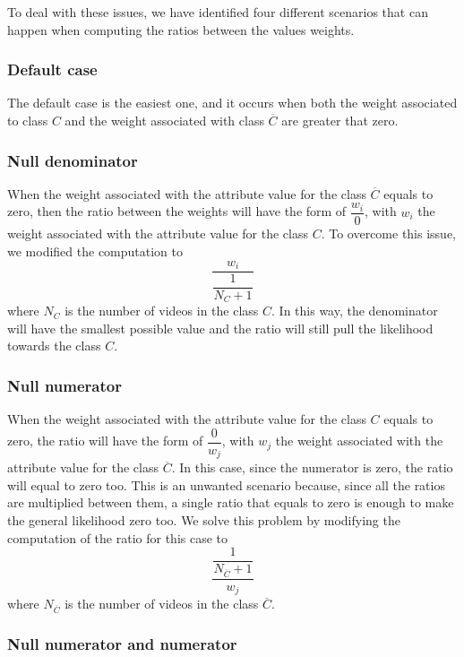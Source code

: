 To deal with these issues, we have identified four different scenarios that can happen when computing the ratios between the values weights.

\subsubsection*{Default case}

The default case is the easiest one, and it occurs when both the weight associated to class $C$ and the weight associated with class $\overline{C}$ are greater that zero.

\subsubsection*{Null denominator}

When the weight associated with the attribute value for the class $\overline{C}$ equals to zero, then the ratio between the weights will have the form of $ \dfrac{w_{i}}{0} $, with $w_{i}$ the weight associated with the attribute value for the class $C$. To overcome this issue, we modified the computation to $$ \dfrac{w_{i}}{\dfrac{1}{N_{C} + 1}} $$ where $N_{C}$ is the number of videos in the class $C$. In this way, the denominator will have the smallest possible value and the ratio will still pull the likelihood towards the class $C$.

\subsubsection*{Null numerator}

When the weight associated with the attribute value for the class $C$ equals to zero, the ratio will have the form of $ \dfrac{0}{w_{j}} $, with $w_{j}$ the weight associated with the attribute value for the class $\overline{C}$. In this case, since the numerator is zero, the ratio will equal to zero too. This is an unwanted scenario because, since all the ratios are multiplied between them, a single ratio that equals to zero is enough to make the general likelihood zero too. We solve this problem by modifying the computation of the ratio for this case to $$ \dfrac{\dfrac{1}{N_{\overline{C}} + 1}}{w_{j}} $$ where $N_{\overline{C}}$ is the number of videos in the class $\overline{C}$.

\subsubsection*{Null numerator and numerator}

